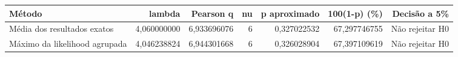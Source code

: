 \begin{tabular}{lrrrrrr}
\toprule
Método & lambda & Pearson q & nu & p aproximado & 100(1-p) (\%) & Decisão a 5\% \\
\midrule
Média dos resultados exatos & 4,060000000 & 6,933696076 & 6 & 0,327022532 & 67,297746755 & Não rejeitar H0 \\
Máximo da likelihood agrupada & 4,046238824 & 6,944301668 & 6 & 0,326028904 & 67,397109619 & Não rejeitar H0 \\
\bottomrule
\end{tabular}
